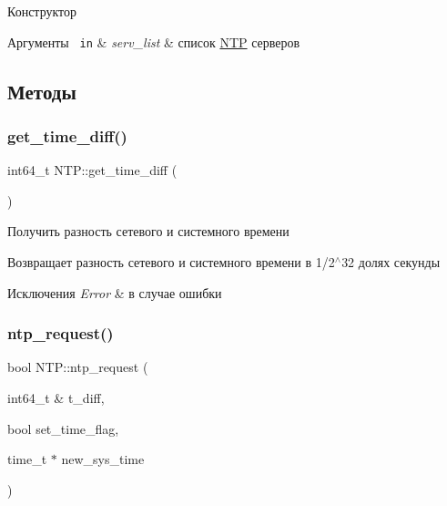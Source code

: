 Конструктор 


\begin{DoxyParams}[1]{Аргументы}
\mbox{\texttt{ in}}  & {\em serv\+\_\+list} & список \mbox{\hyperlink{classNTP}{N\+TP}} серверов \\
\hline
\end{DoxyParams}


\subsection{Методы}
\mbox{\label{classNTP_aadb62dc7f48a7fb76e1ec9d1784e657c}} 
\subsubsection{\texorpdfstring{get\_time\_diff()}{get\_time\_diff()}}
{\footnotesize\ttfamily int64\+\_\+t N\+T\+P\+::get\+\_\+time\+\_\+diff (\begin{DoxyParamCaption}{ }\end{DoxyParamCaption})}



Получить разность сетевого и системного времени 

\begin{DoxyReturn}{Возвращает}
разность сетевого и системного времени в 1/2$^\wedge$32 долях секунды 
\end{DoxyReturn}

\begin{DoxyExceptions}{Исключения}
{\em Error} & в случае ошибки \\
\hline
\end{DoxyExceptions}
\mbox{\label{classNTP_a685ca56d2db2d35537d267b6e84ba594}} 
\subsubsection{\texorpdfstring{ntp\_request()}{ntp\_request()}}
{\footnotesize\ttfamily bool N\+T\+P\+::ntp\+\_\+request (\begin{DoxyParamCaption}\item[{int64\+\_\+t \&}]{t\+\_\+diff,  }\item[{bool}]{set\+\_\+time\+\_\+flag,  }\item[{time\+\_\+t $\ast$}]{new\+\_\+sys\+\_\+time }\end{DoxyParamCaption})\hspace{0.3cm}{\ttfamily [private]}}



